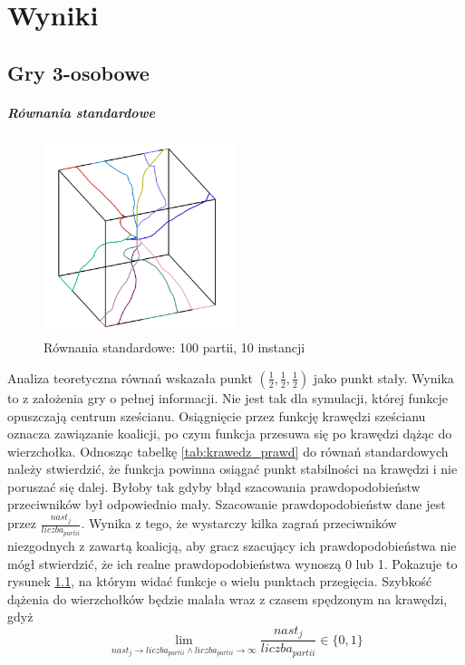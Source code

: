 \chapter{Wyniki}
\label{cha:wyniki}

\section{Gry 3-osobowe}
\label{sec:N3nzal}

\paragraph{Równania standardowe}
\label{sec:r_stan}
\begin{figure}
    \centering
    \includegraphics[width=0.5\textwidth]{pict/wyniki/stand100_10.png}   
    \caption{Równania standardowe: 100 partii, 10 instancji}
	\label{fig:stand100_10} 
\end{figure}

Analiza teoretyczna równań wskazała punkt $(\frac{1}{2},\frac{1}{2},\frac{1}{2})$ jako punkt stały. Wynika to z założenia gry o pełnej informacji. Nie jest tak dla symulacji, której funkcje opuszczają centrum sześcianu. Osiągnięcie przez funkcję krawędzi sześcianu oznacza zawiązanie koalicji, po czym funkcja przesuwa się po krawędzi dążąc do wierzchołka. Odnosząc tabelkę \ref{tab:krawedz_prawd} do równań standardowych należy stwierdzić, że funkcja powinna osiągać punkt stabilności na krawędzi i nie poruszać się dalej. Byłoby tak gdyby błąd szacowania prawdopodobieństw przeciwników był odpowiednio mały. Szacowanie prawdopodobieństw dane jest przez $\frac{nast_{j}}{liczba_{partii}}$. Wynika z tego, że wystarczy kilka zagrań przeciwników niezgodnych z zawartą koalicją, aby gracz szacujący ich prawdopodobieństwa nie mógł stwierdzić, że ich realne prawdopodobieństwa wynoszą 0 lub 1. Pokazuje to rysunek \ref{fig:stand100_10}, na którym widać funkcje o wielu punktach przegięcia. Szybkość dążenia do wierzchołków będzie malała wraz z czasem spędzonym na krawędzi, gdyż 
\[\lim_{nast_j\rightarrow liczba_{partii} \wedge liczba_{partii} \rightarrow \infty} \frac{nast_j}{liczba_{partii}} \in \{0,1\} \]

